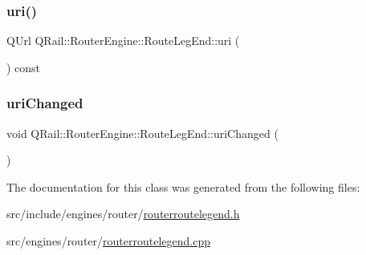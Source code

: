 \mbox{\label{classQRail_1_1RouterEngine_1_1RouteLegEnd_a8a2dca775ba3d184c8332cc2dfa06116}} 
\subsubsection{\texorpdfstring{uri()}{uri()}}
{\footnotesize\ttfamily Q\+Url Q\+Rail\+::\+Router\+Engine\+::\+Route\+Leg\+End\+::uri (\begin{DoxyParamCaption}{ }\end{DoxyParamCaption}) const}

\mbox{\label{classQRail_1_1RouterEngine_1_1RouteLegEnd_a44cb65a3c2119ca9410522c255e10acb}} 
\subsubsection{\texorpdfstring{uriChanged}{uriChanged}}
{\footnotesize\ttfamily void Q\+Rail\+::\+Router\+Engine\+::\+Route\+Leg\+End\+::uri\+Changed (\begin{DoxyParamCaption}{ }\end{DoxyParamCaption})\hspace{0.3cm}{\ttfamily [signal]}}



The documentation for this class was generated from the following files\+:\begin{DoxyCompactItemize}
\item 
src/include/engines/router/\mbox{\hyperlink{routerroutelegend_8h}{routerroutelegend.\+h}}\item 
src/engines/router/\mbox{\hyperlink{routerroutelegend_8cpp}{routerroutelegend.\+cpp}}\end{DoxyCompactItemize}
